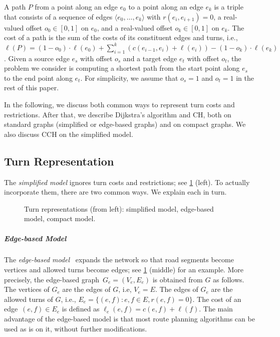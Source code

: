 \documentclass[a4paper, english, cleveref]{lipics-v2021}
\begin{document}
A path $P$ from a point along an edge $e_0$ to a point along an edge $e_k$ is a triple that consists of a sequence of edges $\langle e_0, \dots, e_k \rangle$ with $r(e_i, e_{i + 1}) = 0$, a real-valued offset $o_0 \in [0, 1]$ on $e_0$, and a real-valued offset $o_k \in [0, 1]$ on $e_k$. The cost of a path is the sum of the costs of its constituent edges and turns, i.e., $\ell(P) = (1 - o_0) \cdot \ell(e_0) + \sum_{i = 1}^k (c(e_{i - 1}, e_i) + \ell(e_i)) - (1 - o_k) \cdot \ell(e_k)$. Given a source edge $e_s$ with offset $o_s$ and a target edge $e_t$ with offset $o_t$, the problem we consider is computing a shortest path from the start point along $e_s$ to the end point along $e_t$. For simplicity, we assume that $o_s = 1$ and $o_t = 1$ in the rest of this paper.

In the following, we discuss both common ways to represent turn costs and restrictions. After that, we describe Dijkstra's algorithm and CH, both on standard graphs (simplified or edge-based graphs) and on compact graphs. We also discuss CCH on the simplified model.

\subsection{Turn Representation}

The \emph{simplified model} ignores turn costs and restrictions; see \cref{fig:turn-representation} (left). To actually incorporate them, there are two common ways. We explain each in turn.

\begin{figure}[tb]
  \hfill
  \hfill
  \hfill
  \hfill\hspace{0pt}
  \caption{Turn representations (from left): simplified model, edge-based model, compact model.}
  \label{fig:turn-representation}
\end{figure}

\subparagraph*{Edge-based Model}

The \emph{edge-based model}~\cite{Caldwell61, Winter02} expands the network so that road segments become vertices and allowed turns become edges; see \cref{fig:turn-representation} (middle) for an example. More precisely, the edge-based graph~$G_e = (V_e, E_e)$ is obtained from $G$ as follows. The vertices of $G_e$ are the edges of $G$, i.e, $V_e = E$. The edges of $G_e$ are the allowed turns of $G$, i.e., $E_e = \{(e, f): e, f \in E, r(e, f) = 0\}$. The cost of an edge~$(e, f) \in E_e$ is defined as $\ell_e(e, f) = c(e, f) + \ell(f)$. The main advantage of the edge-based model is that most route planning algorithms can be used as is on it, without further modifications.
\end{document}

